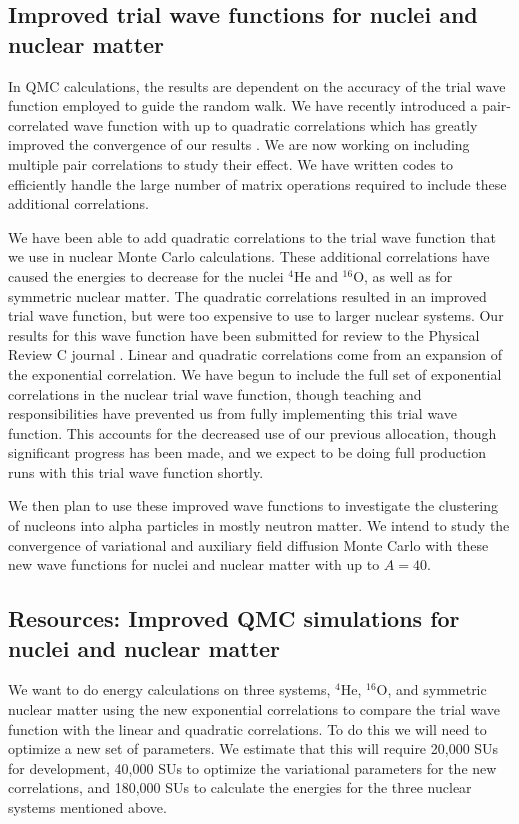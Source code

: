 \documentclass[12pt,letterpaper]{article}
\begin{document}
\subsection{Improved trial wave functions for nuclei and nuclear matter}
In QMC calculations, the results are dependent on the accuracy of the trial wave function employed to guide the random walk. We have recently introduced a pair-correlated wave function with up to quadratic correlations which has greatly improved the convergence of our results \cite{lonardoni2018}. We are now working on including multiple pair correlations to study their effect. We have written codes to efficiently handle the large number of matrix operations required to include these additional correlations.

We have been able to add quadratic correlations to the trial wave function that we use in nuclear Monte Carlo calculations. These additional correlations have caused the energies to decrease for the nuclei $^4$He and $^{16}$O, as well as for symmetric nuclear matter. The quadratic correlations resulted in an improved trial wave function, but were too expensive to use to larger nuclear systems. Our results for this wave function have been submitted for review to the Physical Review C journal \cite{lon18}. Linear and quadratic correlations come from an expansion of the exponential correlation. We have begun to include the full set of exponential correlations in the nuclear trial wave function, though teaching and responsibilities have prevented us from fully implementing this trial wave function. This accounts for the decreased use of our previous allocation, though significant progress has been made, and we expect to be doing full production runs with this trial wave function shortly.

We then plan to use these improved wave functions to investigate the clustering of nucleons into alpha particles in mostly neutron matter. We intend to study the convergence of variational and auxiliary field diffusion Monte Carlo with these new wave functions for nuclei and nuclear matter with up to $A=40$.

\subsection{Resources: Improved QMC simulations for nuclei and nuclear matter}
We want to do energy calculations on three systems, $^4$He, $^{16}$O, and
symmetric nuclear matter using the new exponential correlations to compare the
trial wave function with the linear and quadratic correlations. To do this we
will need to optimize a new set of parameters. We estimate that this will
require 20,000 SUs for development, 40,000 SUs to optimize the variational
parameters for the new correlations, and 180,000 SUs to calculate the energies
for the three nuclear systems mentioned above.
\end{document}
